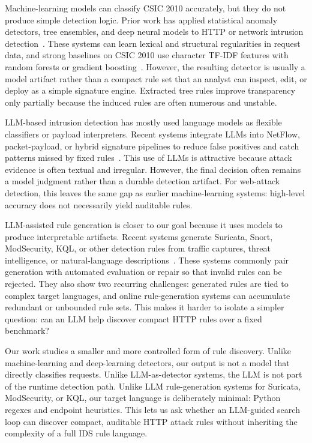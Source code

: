 \documentclass[letterpaper,twocolumn,10pt]{article}
\begin{document}
Machine-learning models can classify CSIC 2010 accurately, but they do not produce simple detection logic. Prior work has applied statistical anomaly detectors, tree ensembles, and deep neural models to HTTP or network intrusion detection~\cite{Lampesberger2012Online,Adewole2025IDS,Odumuyiwa2021HTTPInjection,Wang2024CCBA}. These systems can learn lexical and structural regularities in request data, and strong baselines on CSIC 2010 use character TF-IDF features with random forests or gradient boosting~\cite{MustafaKaggleNotebook}. However, the resulting detector is usually a model artifact rather than a compact rule set that an analyst can inspect, edit, or deploy as a simple signature engine. Extracted tree rules improve transparency only partially because the induced rules are often numerous and unstable.

LLM-based intrusion detection has mostly used language models as flexible classifiers or payload interpreters. Recent systems integrate LLMs into NetFlow, packet-payload, or hybrid signature pipelines to reduce false positives and catch patterns missed by fixed rules~\cite{Davey2025LLMIDS,AlHammouri2025Hybrid}. This use of LLMs is attractive because attack evidence is often textual and irregular. However, the final decision often remains a model judgment rather than a durable detection artifact. For web-attack detection, this leaves the same gap as earlier machine-learning systems: high-level accuracy does not necessarily yield auditable rules.

LLM-assisted rule generation is closer to our goal because it uses models to produce interpretable artifacts. Recent systems generate Suricata, Snort, ModSecurity, KQL, or other detection rules from traffic captures, threat intelligence, or natural-language descriptions~\cite{Roesch1999Snort,Suricata,ModSecurity,KQL,Moreno2025LLMRuleGen,Li2025GRIDAI,Fu2026VibeWAF,Meng2026UniRule,Wang2025RulePilot,Konstantaras2026EDR}. These systems commonly pair generation with automated evaluation or repair so that invalid rules can be rejected. They also show two recurring challenges: generated rules are tied to complex target languages, and online rule-generation systems can accumulate redundant or unbounded rule sets. This makes it harder to isolate a simpler question: can an LLM help discover compact HTTP rules over a fixed benchmark?

Our work studies a smaller and more controlled form of rule discovery. Unlike machine-learning and deep-learning detectors, our output is not a model that directly classifies requests. Unlike LLM-as-detector systems, the LLM is not part of the runtime detection path. Unlike LLM rule-generation systems for Suricata, ModSecurity, or KQL, our target language is deliberately minimal: Python regexes and endpoint heuristics. This lets us ask whether an LLM-guided search loop can discover compact, auditable HTTP attack rules without inheriting the complexity of a full IDS rule language.
\end{document}
